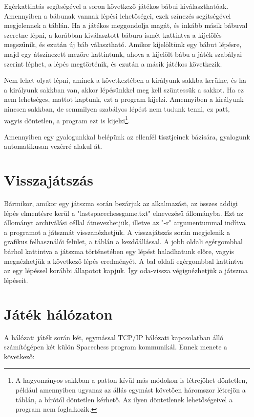 \documentclass[12pt, twoside]{report}
\begin{document}
Egérkattintás segítségével a soron következő játékos bábui kiválaszthatóak. Amennyiben a bábunak vannak lépési lehetőségei, ezek színezés segítségével megjelennek a táblán. Ha a játékos meggondolja magát, és inkább másik bábuval szeretne lépni, a korábban kiválasztott bábura ismét kattintva a kijelölés megszűnik, és ezután új báb választható. Amikor kijelöltünk egy bábut lépésre, majd egy átszínezett mezőre kattintunk, ahova a kijelölt bábu a játék szabályai szerint léphet, a lépés megtörténik, és ezután a másik játékos következik.

Nem lehet olyat lépni, aminek a következtében a királyunk sakkba kerülne, és ha a királyunk sakkban van, akkor lépésünkkel meg kell szüntessük a sakkot. Ha ez nem lehetséges, mattot kaptunk, ezt a program kijelzi. Amennyiben a királyunk nincsen sakkban, de semmilyen szabályos lépést nem tudunk tenni, ez patt, vagyis döntetlen, a program ezt is kijelzi\footnote{A hagyományos sakkban a patton kívül más módokon is létrejöhet döntetlen, például amennyiben ugyanaz az állás egymást követően háromszor létrejön a táblán, a bírótól döntetlen kérhető. Az ilyen döntetlenek lehetőségeivel a program nem foglalkozik.}.

Amennyiben egy gyalogunkkal belépünk az ellenfél tisztjeinek bázisára, gyalogunk automatikusan vezérré alakul át.

\section{Visszajátszás}

Bármikor, amikor egy játszma során bezárjuk az alkalmazást, az összes addigi lépés elmentésre kerül a "lastspacechessgame.txt" elnevezésű állományba. Ezt az állományt archiválási céllal átnevezhetjük, illetve az "-r" argumentummal indítva a programot a játszmát visszanézhetjük. A visszajátszás során megjelenik a grafikus felhasználói felület, a táblán a kezdőállással. A jobb oldali egérgombbal bárhol kattintva a játszma történetében egy lépést haladhatunk előre, vagyis megnézhetjük a következő lépés eredményét. A bal oldali egérgombbal kattintva az egy lépéssel korábbi állapotot kapjuk. Így oda-vissza végignézhetjük a játszma lépéseit.

\section{Játék hálózaton}

A hálózati játék során két, egymással TCP/IP hálózati kapcsolatban álló számítógépen két külön Spacechess program kommunikál. Ennek menete a következő:
\end{document}
